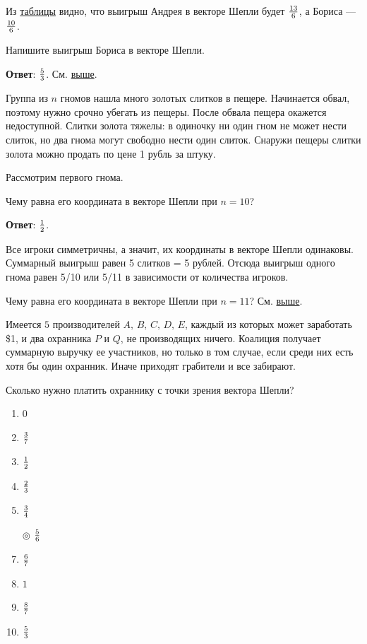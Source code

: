	Из \hyperref[week6-control2:table1]{таблицы} видно, что выигрыш Андрея в векторе Шепли будет $13 \over 6$, а Бориса --- $10 \over 6$.
	
	\task Напишите выигрыш Бориса в векторе Шепли.
	
	\textbf{Ответ}: $5 \over 3$.
	\solution См. \hyperref[week6-control-2:tube]{выше}.
	
	\task
	Группа из $n$ гномов нашла много золотых слитков в пещере. Начинается обвал, поэтому нужно срочно убегать из пещеры. После обвала пещера окажется недоступной. Слитки золота тяжелы: в одиночку ни один гном не может нести слиток, но два гнома могут свободно нести один слиток. Снаружи пещеры слитки золота можно продать по цене 1 рубль за штуку.
	
	Рассмотрим первого гнома.
	
	Чему равна его координата в векторе Шепли при $n=10$?
	
	\textbf{Ответ}: $1 \over 2$.
	
	\solution
	\label{week6-control-2:gnome}
	Все игроки симметричны, а значит, их координаты в векторе Шепли одинаковы. Суммарный выигрыш равен 5 слитков = 5 рублей. Отсюда выигрыш одного гнома равен 5/10 или 5/11 в зависимости от количества игроков.
	
	\task Чему равна его координата в векторе Шепли при $n=11$?
	\solution См. \hyperref[week6-control-2:gnome]{выше}.
	
	\task
	Имеется $5$ производителей $A,\, B,\, C,\, D,\, E$, каждый из которых может заработать \$1, и два охранника $P$ и $Q$, не производящих ничего. Коалиция получает суммарную выручку ее участников, но только в том случае, если среди них есть хотя бы один охранник. Иначе приходят грабители и все забирают.

	Сколько нужно платить охраннику с точки зрения вектора Шепли?
	
	\begin{enumerate}[label=$\circ$]
		\item $0$ \vspace{1mm}
		\item $3 \over 7$ \vspace{1mm}
		\item $1 \over 2$ \vspace{1mm}
		\item $2 \over 3$ \vspace{1mm}
		\item $3 \over 4$ \vspace{1mm}
		\item[$\circledcirc$] $5 \over 6$ \vspace{1mm}
		\item $6 \over 7$ \vspace{1mm}
		\item $1$ \vspace{1mm}
		\item $8 \over 7$ \vspace{1mm}
		\item $5 \over 3$ \vspace{1mm}
	\end{enumerate}

